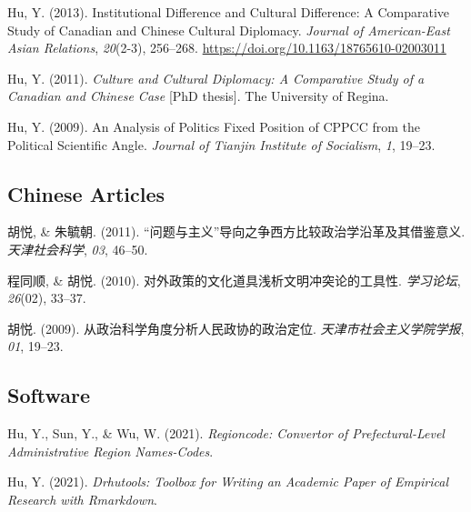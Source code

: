 \documentclass[11pt, a4paper]{awesome-cv}
\begin{document}
\leavevmode\hypertarget{ref-Hu2013}{}%
Hu, Y. (2013). Institutional {Difference} and {Cultural Difference}: {A
Comparative Study} of {Canadian} and {Chinese Cultural Diplomacy}.
\emph{Journal of American-East Asian Relations}, \emph{20}(2-3),
256--268. \url{https://doi.org/10.1163/18765610-02003011}

\leavevmode\hypertarget{ref-Hu2011}{}%
Hu, Y. (2011). \emph{Culture and {Cultural Diplomacy}: {A Comparative
Study} of a {Canadian} and {Chinese Case}} {[}PhD thesis{]}. The
University of Regina.

\leavevmode\hypertarget{ref-Hu2009}{}%
Hu, Y. (2009). {An Analysis of Politics Fixed Position of CPPCC from the
Political Scientific Angle}. \emph{Journal of Tianjin Institute of
Socialism}, \emph{1}, 19--23.

\endgroup

\hypertarget{chinese-articles}{%
\subsection{Chinese Articles}\label{chinese-articles}}

\begingroup
\setlength{\parindent}{-0.5in}
\setlength{\leftskip}{0.5in}

\hypertarget{refs_chinese}{}
\leavevmode\hypertarget{ref-HuYueZhuYuZhao2011}{}%
胡悦, \& 朱毓朝. (2011).
{{``问题与主义''}导向之争{}{}西方比较政治学沿革及其借鉴意义}.
\emph{天津社会科学}, \emph{03}, 46--50.

\leavevmode\hypertarget{ref-ChengTongShunHuYue2010}{}%
程同顺, \& 胡悦. (2010). {对外政策的文化道具{}{}浅析文明冲突论的工具性}.
\emph{学习论坛}, \emph{26}(02), 33--37.

\leavevmode\hypertarget{ref-HuYue2009}{}%
胡悦. (2009). {从政治科学角度分析人民政协的政治定位}.
\emph{天津市社会主义学院学报}, \emph{01}, 19--23.

\endgroup

\hypertarget{software}{%
\subsection{Software}\label{software}}

\begingroup
\setlength{\parindent}{-0.5in}
\setlength{\leftskip}{0.5in}

\hypertarget{refs_software}{}
\leavevmode\hypertarget{ref-HuEtAl2021}{}%
Hu, Y., Sun, Y., \& Wu, W. (2021). \emph{Regioncode: {Convertor} of
{Prefectural}-{Level Administrative Region Names}-{Codes}}.

\leavevmode\hypertarget{ref-Hu2021}{}%
Hu, Y. (2021). \emph{Drhutools: {Toolbox} for {Writing} an {Academic
Paper} of {Empirical Research} with {Rmarkdown}}.
\end{document}
